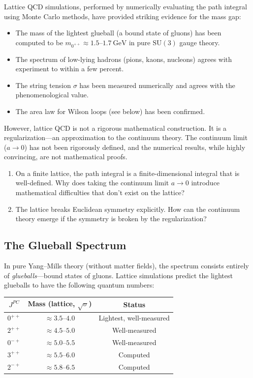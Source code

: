 Lattice QCD simulations, performed by numerically evaluating the path integral using Monte Carlo methods, have provided striking evidence for the mass gap:
\begin{itemize}
  \item The mass of the lightest glueball (a bound state of gluons) has been computed to be $m_{0^{++}} \approx 1.5\text{--}1.7~\mathrm{GeV}$ in pure $\mathrm{SU}(3)$ gauge theory.
  \item The spectrum of low-lying hadrons (pions, kaons, nucleons) agrees with experiment to within a few percent.
  \item The string tension $\sigma$ has been measured numerically and agrees with the phenomenological value.
  \item The area law for Wilson loops (see below) has been confirmed.
\end{itemize}

However, lattice QCD is not a rigorous mathematical construction. It is a regularization---an approximation to the continuum theory. The continuum limit ($a \to 0$) has not been rigorously defined, and the numerical results, while highly convincing, are not mathematical proofs.

\begin{checkyou}
\begin{enumerate}
\item On a finite lattice, the path integral is a finite-dimensional integral that is well-defined. Why does taking the continuum limit $a \to 0$ introduce mathematical difficulties that don't exist on the lattice?
\item The lattice breaks Euclidean symmetry explicitly. How can the continuum theory emerge if the symmetry is broken by the regularization?
\end{enumerate}
\end{checkyou}

\subsection{The Glueball Spectrum}

In pure Yang--Mills theory (without matter fields), the spectrum consists entirely of \textit{glueballs}---bound states of gluons. Lattice simulations predict the lightest glueballs to have the following quantum numbers:

\begin{center}
\renewcommand{\arraystretch}{1.3}
\begin{tabular}{|c|c|c|}
\hline
$J^{PC}$ & Mass (lattice, $\sqrt{\sigma}$) & Status \\
\hline
$0^{++}$ & $\approx 3.5\text{--}4.0$ & Lightest, well-measured \\
$2^{++}$ & $\approx 4.5\text{--}5.0$ & Well-measured \\
$0^{-+}$ & $\approx 5.0\text{--}5.5$ & Well-measured \\
$3^{++}$ & $\approx 5.5\text{--}6.0$ & Computed \\
$2^{-+}$ & $\approx 5.8\text{--}6.5$ & Computed \\
\hline
\end{tabular}
\end{center}

